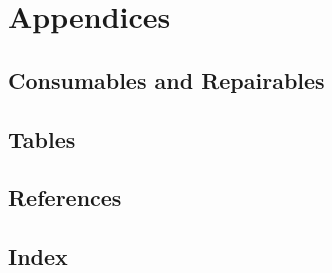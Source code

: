 \documentclass[11pt,fleqn]{book} %
\begin{document}
\part{Appendices}
\begin{appendices}
	
  \chapter{Consumables and Repairables}
  \label{app:consumables-and-repairables}
  
  \chapter{Tables}
  \label{app:tables}
  
  \chapter{References}
  \label{app:references}
  
  \chapter{Index}
  \label{app:index}
  
\end{appendices}

\cleardoublepage %
\setlength{\columnsep}{0.75cm} %
\printindex %

\listoftodos
\end{document}
